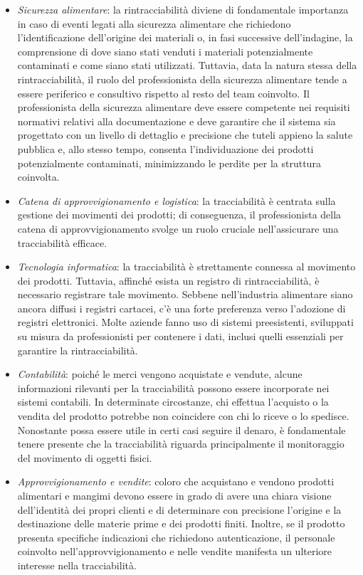 \begin{itemize}
    \item \textit{Sicurezza alimentare}: la rintracciabilità diviene di fondamentale importanza in caso di eventi legati alla sicurezza alimentare che richiedono l'identificazione dell'origine dei materiali o, in fasi successive dell'indagine, la comprensione di dove siano stati venduti i materiali potenzialmente contaminati e come siano stati utilizzati. Tuttavia, data la natura stessa della rintracciabilità, il ruolo del professionista della sicurezza alimentare tende a essere periferico e consultivo rispetto al resto del team coinvolto. Il professionista della sicurezza alimentare deve essere competente nei requisiti normativi relativi alla documentazione e deve garantire che il sistema sia progettato con un livello di dettaglio e precisione che tuteli appieno la salute pubblica e, allo stesso tempo, consenta l'individuazione dei prodotti potenzialmente contaminati, minimizzando le perdite per la struttura coinvolta.
    \item \textit{Catena di approvvigionamento e logistica}: la tracciabilità è centrata sulla gestione dei movimenti dei prodotti; di conseguenza, il professionista della catena di approvvigionamento svolge un ruolo cruciale nell'assicurare una tracciabilità efficace.
    \item \textit{Tecnologia informatica}: la tracciabilità è strettamente connessa al movimento dei prodotti. Tuttavia, affinché esista un registro di rintracciabilità, è necessario registrare tale movimento. Sebbene nell'industria alimentare siano ancora diffusi i registri cartacei, c'è una forte preferenza verso l'adozione di registri elettronici. Molte aziende fanno uso di sistemi preesistenti, sviluppati su misura da professionisti per contenere i dati, inclusi quelli essenziali per garantire la rintracciabilità.
    \item \textit{Contabilità}: poiché le merci vengono acquistate e vendute, alcune informazioni rilevanti per la tracciabilità possono essere incorporate nei sistemi contabili. In determinate circostanze, chi effettua l'acquisto o la vendita del prodotto potrebbe non coincidere con chi lo riceve o lo spedisce. Nonostante possa essere utile in certi casi seguire il denaro, è fondamentale tenere presente che la tracciabilità riguarda principalmente il monitoraggio del movimento di oggetti fisici.
    \item \textit{Approvvigionamento e vendite}: coloro che acquistano e vendono prodotti alimentari e mangimi devono essere in grado di avere una chiara visione dell'identità dei propri clienti e di determinare con precisione l'origine e la destinazione delle materie prime e dei prodotti finiti. Inoltre, se il prodotto presenta specifiche indicazioni che richiedono autenticazione, il personale coinvolto nell'approvvigionamento e nelle vendite manifesta un ulteriore interesse nella tracciabilità.

\end{itemize}

